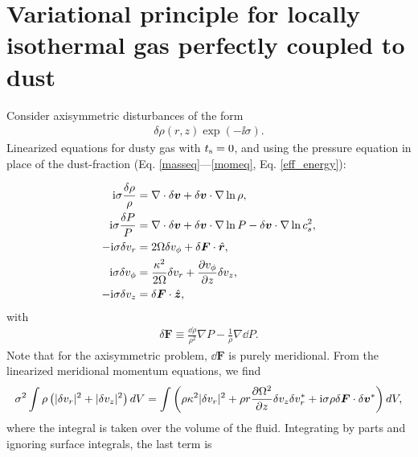 \section{Variational principle for locally isothermal gas perfectly
  coupled to dust}\label{var_prin}

Consider axisymmetric disturbances of the form
\begin{align}
  \delta\rho(r,z)\exp{\left(-\ii\sigma\right)}. 
\end{align}
Linearized equations for dusty gas with $t_\mathrm{s}=0$, and using the
pressure equation in place of the dust-fraction
(Eq. \ref{masseq}---\ref{momeq}, Eq. \ref{eff_energy}): 

\begin{align}
  \mathrm{i}\sigma\frac{\delta\rho}{\rho} &= \nabla\cdot\delta\bm{v} +
  \delta\bm{v}\cdot\nabla\ln{\rho},\\
  \mathrm{i}\sigma\frac{\delta P}{P} &= \nabla\cdot\delta\bm{v} +
  \delta\bm{v}\cdot\nabla\ln{P} - \delta\bm{v}\cdot\nabla\ln{c_s^2},\\
  -\mathrm{i}\sigma\delta v_r  &= 2\Omega\delta v_\phi + 
  \delta\bm{F}\cdot\hat{\bm{r}},\\
  \mathrm{i}\sigma\delta v_\phi &= \frac{\kappa^2}{2\Omega}\delta v_r + \frac{\partial
    v_\phi}{\partial z}\delta v_z,\\
  -\mathrm{i}\sigma\delta v_z &=  \delta\bm{F}\cdot\hat{\bm{z}},
\end{align} 
with
\begin{align}
  \delta \bm{F} \equiv \frac{\dd\rho}{\rho^2}\nabla P -
  \frac{1}{\rho}\nabla\dd P.
\end{align}
Note that for the axisymmetric problem, $\dd\bm{F}$ is purely
meridional. 
From the linearized meridional momentum equations, we find 
\begin{align}
  \sigma^2\int\rho\left(|\delta v_r|^2 + |\delta v_z|^2\right)dV = \int\left( \rho
  \kappa^2 |\delta v_r|^2 + \rho r\frac{\partial \Omega^2}{\partial z} \delta v_z \delta
  v_r^*  + \mathrm{i}\sigma \rho \delta \bm{F}\cdot\delta\bm{v}^*
  \right)dV,
\end{align}
where the integral is taken over the volume of the fluid. Integrating
by parts and ignoring surface integrals, the last term is
